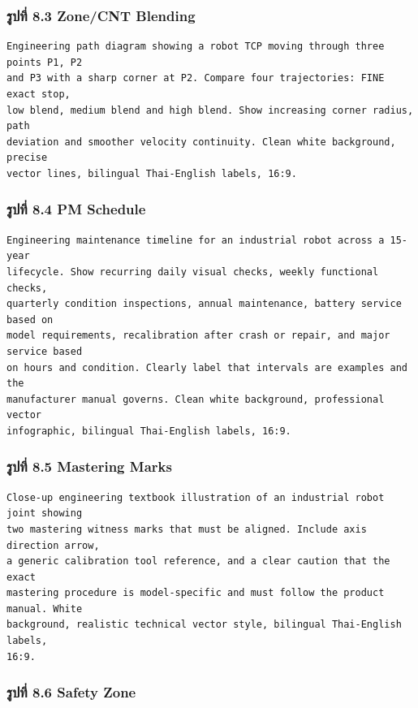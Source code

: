 \subsubsection{รูปที่ 8.3 Zone/CNT Blending}

\begin{verbatim}
Engineering path diagram showing a robot TCP moving through three points P1, P2
and P3 with a sharp corner at P2. Compare four trajectories: FINE exact stop,
low blend, medium blend and high blend. Show increasing corner radius, path
deviation and smoother velocity continuity. Clean white background, precise
vector lines, bilingual Thai-English labels, 16:9.
\end{verbatim}

\subsubsection{รูปที่ 8.4 PM Schedule}

\begin{verbatim}
Engineering maintenance timeline for an industrial robot across a 15-year
lifecycle. Show recurring daily visual checks, weekly functional checks,
quarterly condition inspections, annual maintenance, battery service based on
model requirements, recalibration after crash or repair, and major service based
on hours and condition. Clearly label that intervals are examples and the
manufacturer manual governs. Clean white background, professional vector
infographic, bilingual Thai-English labels, 16:9.
\end{verbatim}

\subsubsection{รูปที่ 8.5 Mastering Marks}

\begin{verbatim}
Close-up engineering textbook illustration of an industrial robot joint showing
two mastering witness marks that must be aligned. Include axis direction arrow,
a generic calibration tool reference, and a clear caution that the exact
mastering procedure is model-specific and must follow the product manual. White
background, realistic technical vector style, bilingual Thai-English labels,
16:9.
\end{verbatim}

\subsubsection{รูปที่ 8.6 Safety Zone}

